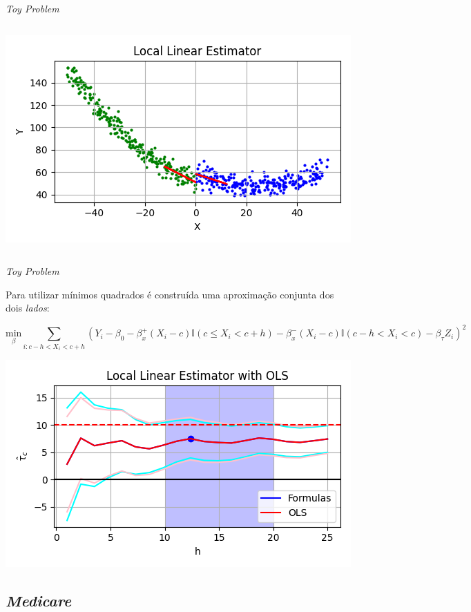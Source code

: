 \documentclass[aspectratio=1610, 10pt]{beamer}
\begin{document}
\begin{frame}{\emph{Toy Problem}}
\begin{columns}[T]
\begin{column}{0.48\linewidth}
            \includegraphics[width=\linewidth, trim=0cm 0cm 0cm 0.8cm, clip]{toy/LocalLinear2.png}

        \end{column}
	\end{columns}
\end{frame}


\begin{frame}{\emph{Toy Problem}}

    Para utilizar mínimos quadrados é construída uma aproximação conjunta dos dois \emph{lados}:

    \begin{equation*}
        \underset{\beta}{\mathrm{min}} \sum_{i:c-h < X_i < c+h}(Y_i - \beta_0 - \beta_x^+(X_i - c) \mathbb{I}(c \leq X_i < c+h) - \beta_x^-(X_i - c) \mathbb{I}(c - h < X_i < c) - \beta_{\tau} Z_i)^2
    \end{equation*}

    \vspace{-0.3cm}
    \centering
    \includegraphics[width=0.7\linewidth]{toy/TauOLS.png}
\end{frame}



\subsection{\textit{Medicare}}
\end{document}
